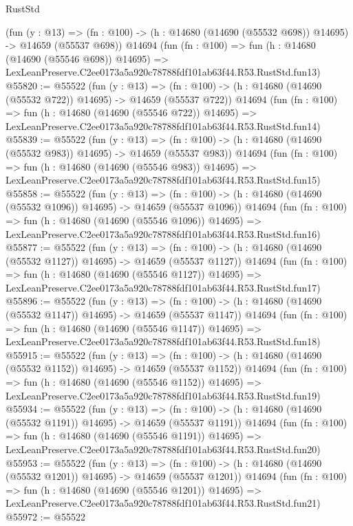 \begin{lexlean}{RustStd}
\begin{coremodule}
    (fun (y : @13) =>
    (fn : @100) -> (h : @14680 (@14690 (@55532 @698)) @14695) -> @14659 (@55537 @698))
    @14694
    (fun (fn : @100) =>
    fun (h : @14680 (@14690 (@55546 @698)) @14695) =>
    LexLeanPreserve.C2ee0173a5a920c78788fdf101ab63f44.R53.RustStd.fun13)
@55820 := @55522
    (fun (y : @13) =>
    (fn : @100) -> (h : @14680 (@14690 (@55532 @722)) @14695) -> @14659 (@55537 @722))
    @14694
    (fun (fn : @100) =>
    fun (h : @14680 (@14690 (@55546 @722)) @14695) =>
    LexLeanPreserve.C2ee0173a5a920c78788fdf101ab63f44.R53.RustStd.fun14)
@55839 := @55522
    (fun (y : @13) =>
    (fn : @100) -> (h : @14680 (@14690 (@55532 @983)) @14695) -> @14659 (@55537 @983))
    @14694
    (fun (fn : @100) =>
    fun (h : @14680 (@14690 (@55546 @983)) @14695) =>
    LexLeanPreserve.C2ee0173a5a920c78788fdf101ab63f44.R53.RustStd.fun15)
@55858 := @55522
    (fun (y : @13) =>
    (fn : @100) -> (h : @14680 (@14690 (@55532 @1096)) @14695) -> @14659 (@55537 @1096))
    @14694
    (fun (fn : @100) =>
    fun (h : @14680 (@14690 (@55546 @1096)) @14695) =>
    LexLeanPreserve.C2ee0173a5a920c78788fdf101ab63f44.R53.RustStd.fun16)
@55877 := @55522
    (fun (y : @13) =>
    (fn : @100) -> (h : @14680 (@14690 (@55532 @1127)) @14695) -> @14659 (@55537 @1127))
    @14694
    (fun (fn : @100) =>
    fun (h : @14680 (@14690 (@55546 @1127)) @14695) =>
    LexLeanPreserve.C2ee0173a5a920c78788fdf101ab63f44.R53.RustStd.fun17)
@55896 := @55522
    (fun (y : @13) =>
    (fn : @100) -> (h : @14680 (@14690 (@55532 @1147)) @14695) -> @14659 (@55537 @1147))
    @14694
    (fun (fn : @100) =>
    fun (h : @14680 (@14690 (@55546 @1147)) @14695) =>
    LexLeanPreserve.C2ee0173a5a920c78788fdf101ab63f44.R53.RustStd.fun18)
@55915 := @55522
    (fun (y : @13) =>
    (fn : @100) -> (h : @14680 (@14690 (@55532 @1152)) @14695) -> @14659 (@55537 @1152))
    @14694
    (fun (fn : @100) =>
    fun (h : @14680 (@14690 (@55546 @1152)) @14695) =>
    LexLeanPreserve.C2ee0173a5a920c78788fdf101ab63f44.R53.RustStd.fun19)
@55934 := @55522
    (fun (y : @13) =>
    (fn : @100) -> (h : @14680 (@14690 (@55532 @1191)) @14695) -> @14659 (@55537 @1191))
    @14694
    (fun (fn : @100) =>
    fun (h : @14680 (@14690 (@55546 @1191)) @14695) =>
    LexLeanPreserve.C2ee0173a5a920c78788fdf101ab63f44.R53.RustStd.fun20)
@55953 := @55522
    (fun (y : @13) =>
    (fn : @100) -> (h : @14680 (@14690 (@55532 @1201)) @14695) -> @14659 (@55537 @1201))
    @14694
    (fun (fn : @100) =>
    fun (h : @14680 (@14690 (@55546 @1201)) @14695) =>
    LexLeanPreserve.C2ee0173a5a920c78788fdf101ab63f44.R53.RustStd.fun21)
@55972 := @55522

\end{coremodule}
\end{lexlean}
